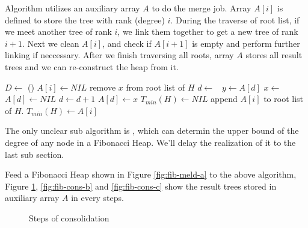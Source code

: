 \documentclass{article}
\begin{document}
Algorithm  utilizes an auxiliary array $A$ to do the 
merge job. Array $A[i]$ is defined to store the tree with rank (degree) $i$.
During the traverse of root list, if we meet another tree of rank $i$, we 
link them together to get a new tree of rank $i+1$. Next we clean $A[i]$, 
and check if $A[i+1]$ is empty and perform further linking if neccessary.
After we finish traversing all roots, array $A$ stores all result trees
and we can re-construct the heap from it.

\begin{algorithmic}
  \State $D \gets $ ()
    \State $A[i] \gets NIL$
  \EndFor
    \State remove $x$ from root list of $H$
    \State $d \gets $ 
    \
      \State $y \gets A[d]$
      \State $x \gets $ 
      \State $A[d] \gets NIL$
      \State $d \gets d + 1$
    \EndWhile
    \State $A[d] \gets x$
  \EndFor
  \State $T_{min}(H) \gets NIL$ 
  \For{$i \gets 0$ to $D$}
      \State append $A[i]$ to root list of $H$.
        \State $T_{min}(H) \gets A[i]$
      \EndIf
    \EndIf
  \EndFor
\EndFunction
\end{algorithmic}

The only unclear sub algorithm is , which can determin
the upper bound of the degree of any node in a Fibonacci Heap. We'll delay 
the realization of it to the last sub section.

Feed a Fibonacci Heap shown in Figure \ref{fig:fib-meld-a} to the above algorithm,
Figure \ref{fig:fib-cons-a}, \ref{fig:fib-cons-b} and \ref{fig:fib-cons-c}
show the result trees stored in auxiliary array $A$ in every steps.

\begin{figure}[htbp]
  \centering
  \subfloat[Step 4]{\texttt{[image: img/fib-cons-04.ps]}}
  \caption{Steps of consolidation} \label{fig:fib-cons-a}
\end{figure}
\end{document}
